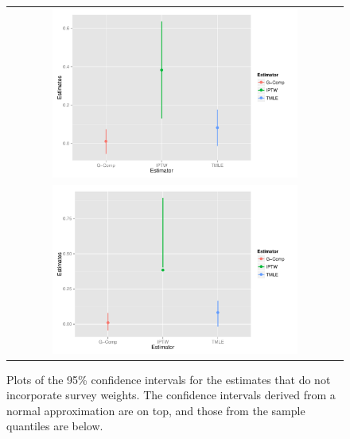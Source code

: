 \documentclass{article}
\begin{document}
\begin{figure}
\centering
\begin{tabular}{c}
\includegraphics[width=0.75\textwidth]{figures/naiveBootstrapNormalCI.pdf} \\
\includegraphics[width=0.75\textwidth]{figures/naiveBootstrapQuantileCI.pdf}
\end{tabular}
\caption{Plots of the 95\% confidence intervals for the estimates that do not incorporate survey weights. The confidence intervals derived from a normal approximation are on top, and those from the sample quantiles are below.}
\label{fig:cis}
\end{figure}
\end{document}
